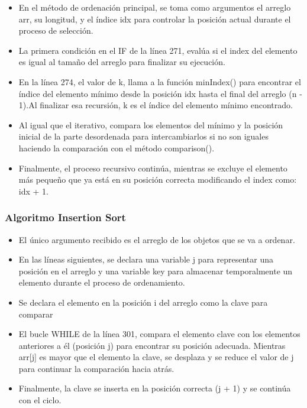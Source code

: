 \documentclass{article}
\begin{document}
        \begin{itemize}
            \item En el método de ordenación principal, se toma como argumentos el arreglo arr, su longitud, y el índice idx para controlar la posición actual durante el proceso de selección.
            \item La primera condición en el IF de la línea 271, evalúa si el index del elemento es igual al tamaño del arreglo para finalizar su ejecución. 
            \item En la línea 274, el valor de k, llama a la función minIndex() para encontrar el índice del elemento mínimo desde la posición idx hasta el final del arreglo (n - 1).Al finalizar esa recursión, k es el índice del elemento mínimo encontrado.
            \item Al igual que el iterativo, compara los elementos del mínimo y la posición inicial de la parte desordenada para intercambiarlos si no son iguales haciendo la comparación con el método comparison().
            \item Finalmente, el proceso recursivo continúa, mientras se excluye el elemento más pequeño que ya está en su posición correcta modificando el index como: idx + 1.
        \end{itemize}

        \subsubsection{Algoritmo Insertion Sort}

        
        
        \begin{itemize}	
            \item El único argumento recibido es el arreglo de los objetos que se va a ordenar.
            \item En las líneas siguientes, se declara una variable j para representar una posición en el arreglo y una variable key para almacenar temporalmente un elemento durante el proceso de ordenamiento.
            \item Se declara el elemento en la posición i del arreglo como la clave para comparar 
            \item El bucle WHILE de la línea 301, compara el elemento clave con los elementos anteriores a él (posición j) para encontrar su posición adecuada. Mientras arr[j] es mayor que el elemento la clave, se desplaza y se reduce el valor de j para continuar la comparación hacia atrás.
            \item Finalmente, la clave se inserta en la posición correcta (j + 1) y se continúa con el ciclo.  
        \end{itemize}
\end{document}
